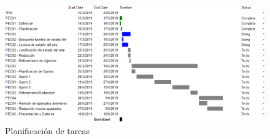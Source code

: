 \begin{figure}[h]
	\centering
	\includegraphics[width=1\textwidth]{figs/gantt_init.PNG}
	\caption{Planificación de tareas}
	\label{fig:gantt}
\end{figure}
